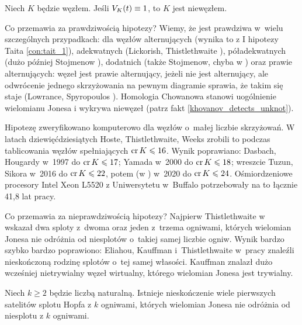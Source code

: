 \begin{conjecture}
%
\label{con:jones}%
    Niech $K$ będzie węzłem.
    Jeśli $V_K(t) \equiv 1$, to $K$ jest niewęzłem.
\end{conjecture}

Co przemawia za prawdziwością hipotezy?
Wiemy, że jest prawdziwa w~wielu szczególnych przypadkach: dla węzłów alternujących (wynika to z I hipotezy Taita \ref{con:tait_1}), adekwatnych (Lickorish, Thistlethwaite \cite{lickorish88}), póładekwatnych (dużo później Stojmenow \cite{stoimenow11}), dodatnich (także Stojmenow, chyba w \cite{stoimenow03}) oraz prawie alternujących: węzeł jest prawie alternujący, jeżeli nie jest alternujący, ale odwrócenie jednego skrzyżowania na pewnym diagramie sprawia, że takim się staje (Lowrance, Spyropoulos \cite{lowrance17}).
%
%
%
%
%
%
%
%
%
%
Homologia Chowanowa stanowi uogólnienie wielomianu Jonesa i wykrywa niewęzeł (patrz fakt \ref{khovanov_detects_unknot}).
%

Hipotezę zweryfikowano komputerowo dla węzłów o~małej liczbie skrzyżowań.
W latach dziewięćdziesiątych Hoste, Thistlethwaite, Weeks \cite{thistlethwaite98} zrobili to podczas tablicowania węzłów spełniających $\operatorname{cr} K \leqslant 16$.
%
%
%
Wynik poprawiano:
Dasbach, Hougardy \cite{hougardy97} w~1997 do $\operatorname{cr} K \leqslant 17$; 
%
%
Yamada \cite{yamada00} w~2000 do $\operatorname{cr} K \leqslant 18$;
%
wreszcie Tuzun, Sikora \cite{tuzun18} w~2016 do $\operatorname{cr} K \leqslant 22$,
%
%
potem (w \cite{tuzun21}) w~2020 do $\operatorname{cr} K \leqslant 24$.
Ośmiordzeniowe procesory Intel Xeon L5520 z Uniwersytetu w~Buffalo potrzebowały na to łącznie 41,8 lat pracy.

Co przemawia za nieprawdziwością hipotezy?
Najpierw Thistlethwaite w~\cite{thistlethwaite01} wskazał dwa sploty z~dwoma oraz jeden z~trzema ogniwami, których wielomian Jonesa nie odróżnia od niesplotów o~takiej samej liczbie ogniw.
%
Wynik bardzo szybko bardzo poprawiono: Eliahou, Kauffman i~Thistlethwaite w~pracy \cite{eliahou03} znaleźli nieskończoną rodzinę splotów o~tej samej własości.
%
%
Kauffman znalazł dużo wcześniej nietrywialny węzeł wirtualny, którego wielomian Jonesa jest trywialny.

\begin{proposition}
%
%
    Niech $k \ge 2$ będzie liczbą naturalną.
    Istnieje nieskończenie wiele pierwszych satelitów splotu Hopfa z $k$ ogniwami, których wielomian Jonesa nie odróżnia od niesplotu z $k$ ogniwami.
\end{proposition}

